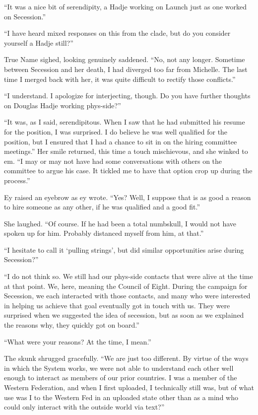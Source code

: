``It was a nice bit of serendipity, a Hadje working on Launch just as one worked on Secession.''

``I have heard mixed responses on this from the clade, but do you consider yourself a Hadje still?''

True Name sighed, looking genuinely saddened. ``No, not any longer. Sometime between Secession and her death, I had diverged too far from Michelle. The last time I merged back with her, it was quite difficult to rectify those conflicts.''

``I understand. I apologize for interjecting, though. Do you have further thoughts on Douglas Hadje working phys-side?''

``It was, as I said, serendipitous. When I saw that he had submitted his resume for the position, I was surprised. I do believe he was well qualified for the position, but I ensured that I had a chance to sit in on the hiring committee meetings.'' Her smile returned, this time a touch mischievous, and she winked to em. ``I may or may not have had some conversations with others on the committee to argue his case. It tickled me to have that option crop up during the process.''

Ey raised an eyebrow as ey wrote. ``Yes? Well, I suppose that is as good a reason to hire someone as any other, if he was qualified and a good fit.''

She laughed. ``Of course. If he had been a total numbskull, I would not have spoken up for him. Probably distanced myself from him, at that.''

``I hesitate to call it `pulling strings', but did similar opportunities arise during Secession?''

``I do not think so. We still had our phys-side contacts that were alive at the time at that point. We, here, meaning the Council of Eight. During the campaign for Secession, we each interacted with those contacts, and many who were interested in helping us achieve that goal eventually got in touch with us. They were surprised when we suggested the idea of secession, but as soon as we explained the reasons why, they quickly got on board.''

``What were your reasons? At the time, I mean.''

The skunk shrugged gracefully. ``We are just too different. By virtue of the ways in which the System works, we were not able to understand each other well enough to interact as members of our prior countries. I was a member of the Western Federation, and when I first uploaded, I technically still was, but of what use was I to the Western Fed in an uploaded state other than as a mind who could only interact with the outside world via text?''


